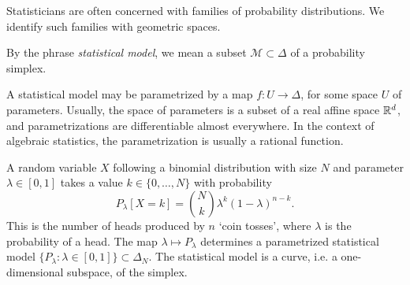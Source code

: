 \documentclass[cclicense]{hmcthesis}
\newcommand*{\Mod}{\mathcal{M}}
\numberwithin{equation}{section}
\begin{document}
    Statisticians are often concerned with families of probability
    distributions.  We identify such families with geometric spaces.
    \begin{definition}
    By the phrase \emph{statistical model}, we mean a subset $\Mod \subset
    \Delta$ of a probability simplex.
    \end{definition}
    \noindent A statistical model may be parametrized by a map $f: U \to
    \Delta$, for some space $U$ of parameters.  Usually, the space of parameters
    is a subset of a real affine space $\mathbb{R}^d$, and parametrizations are
    differentiable almost everywhere.  In the context of algebraic statistics,
    the parametrization is usually a rational function.
    \begin{example}
    A random variable $X$ following a binomial distribution with size $N$ and
    parameter $\lambda \in [0,1]$ takes a value $k \in \{0,\ldots, N\}$ with
    probability
    \[
        P_\lambda[X = k] = {N \choose k} \lambda^k(1-\lambda)^{n-k}.
    \]
    This is the number of heads produced by $n$ `coin tosses', where $\lambda$
    is the probability of a head.  The map $\lambda \mapsto P_\lambda$
    determines a parametrized statistical model $\{P_\lambda : \lambda \in [0,1]
    \} \subset \Delta_N$. The statistical model is a curve, i.e. a
    one-dimensional subspace, of the simplex.  


\end{example}
\end{document}

